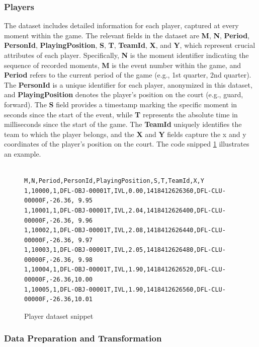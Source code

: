 \subsubsection{Players}
\label{sect:players}

The dataset includes detailed information for each player, captured at every moment within the game. The relevant fields in the dataset are \textbf{M}, \textbf{N}, \textbf{Period}, \textbf{PersonId}, \textbf{PlayingPosition}, \textbf{S}, \textbf{T}, \textbf{TeamId}, \textbf{X}, and \textbf{Y}, which represent crucial attributes of each player. Specifically, \textbf{N} is the moment identifier indicating the sequence of recorded moments, \textbf{M} is the event number within the game, and \textbf{Period} refers to the current period of the game (e.g., 1st quarter, 2nd quarter). The \textbf{PersonId} is a unique identifier for each player, anonymized in this dataset, and \textbf{PlayingPosition} denotes the player's position on the court (e.g., guard, forward). The \textbf{S} field provides a timestamp marking the specific moment in seconds since the start of the event, while \textbf{T} represents the absolute time in milliseconds since the start of the game. The \textbf{TeamId} uniquely identifies the team to which the player belongs, and the \textbf{X} and \textbf{Y} fields capture the x and y coordinates of the player's position on the court. The code snipped \ref{fig:player-dataset} illustrates an example.
\begin{figure}[t]
    \centering
    \begin{BVerbatim}
           M,N,Period,PersonId,PlayingPosition,S,T,TeamId,X,Y
1,10000,1,DFL-OBJ-00001T,IVL,0.00,1418412626360,DFL-CLU-00000F,-26.36, 9.95
1,10001,1,DFL-OBJ-00001T,IVL,2.04,1418412626400,DFL-CLU-00000F,-26.36, 9.96
1,10002,1,DFL-OBJ-00001T,IVL,2.08,1418412626440,DFL-CLU-00000F,-26.36, 9.97
1,10003,1,DFL-OBJ-00001T,IVL,2.05,1418412626480,DFL-CLU-00000F,-26.36, 9.98
1,10004,1,DFL-OBJ-00001T,IVL,1.90,1418412626520,DFL-CLU-00000F,-26.36,10.00
1,10005,1,DFL-OBJ-00001T,IVL,1.90,1418412626560,DFL-CLU-00000F,-26.36,10.01
    \end{BVerbatim}
    \caption{Player dataset snippet}
    \label{fig:player-dataset}
\end{figure}

\subsubsection{Data Preparation and Transformation}
\label{sect:data-prep-soccer}

